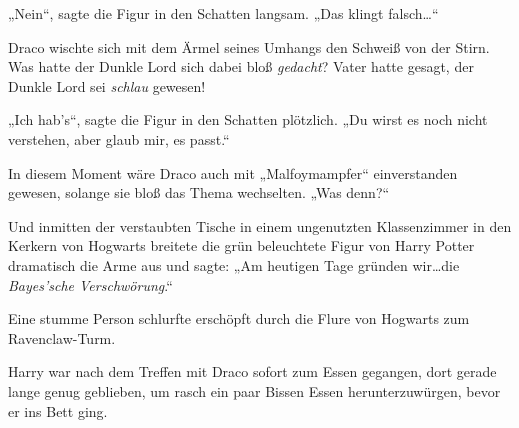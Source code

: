 „Nein“, sagte die Figur in den Schatten langsam. „Das klingt falsch…“

Draco wischte sich mit dem Ärmel seines Umhangs den Schweiß von der Stirn. Was hatte der Dunkle Lord sich dabei bloß \emph{gedacht}? Vater hatte gesagt, der Dunkle Lord sei \emph{schlau} gewesen!

„Ich hab’s“, sagte die Figur in den Schatten plötzlich. „Du wirst es noch nicht verstehen, aber glaub mir, es passt.“

In diesem Moment wäre Draco auch mit „Malfoymampfer“ einverstanden gewesen, solange sie bloß das Thema wechselten. „Was denn?“

Und inmitten der verstaubten Tische in einem ungenutzten Klassenzimmer in den Kerkern von Hogwarts breitete die grün beleuchtete Figur von Harry Potter dramatisch die Arme aus und sagte: „Am heutigen Tage gründen wir…die \emph{Bayes’sche Verschwörung}.“

\later

Eine stumme Person schlurfte erschöpft durch die Flure von Hogwarts zum Ravenclaw-Turm.

Harry war nach dem Treffen mit Draco sofort zum Essen gegangen, dort gerade lange genug geblieben, um rasch ein paar Bissen Essen herunterzuwürgen, bevor er ins Bett ging.

